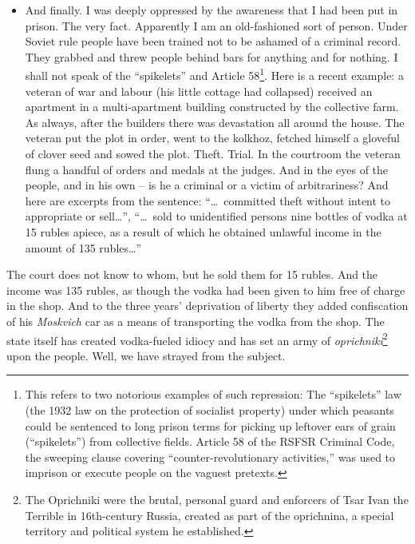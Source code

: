 \documentclass[openright]{bookest}
\begin{document}
\begin{itemize}
\item And finally. I was deeply oppressed by the awareness that I had been put in prison. The very fact. Apparently I am an old-fashioned sort of person. Under Soviet rule people have been trained not to be ashamed of a criminal record. They grabbed and threw people behind bars for anything and for nothing. I shall not speak of the ``spikelets'' and Article 58\footnote{This refers to two notorious examples of such repression: The ``spikelets'' law (the 1932 law on the protection of socialist property) under which peasants could be sentenced to long prison terms for picking up leftover ears of grain (``spikelets'') from collective fields. Article 58 of the RSFSR Criminal Code, the sweeping clause covering ``counter-revolutionary activities,'' was used to imprison or execute people on the vaguest pretexts.}. Here is a recent example: a veteran of war and labour (his little cottage had collapsed) received an apartment in a multi-apartment building constructed by the collective farm. As always, after the builders there was devastation all around the house. The veteran put the plot in order, went to the kolkhoz, fetched himself a gloveful of clover seed and sowed the plot. Theft. Trial. In the courtroom the veteran flung a handful of orders and medals at the judges. And in the eyes of the people, and in his own -- is he a criminal or a victim of arbitrariness? And here are excerpts from the sentence: ``\ldots~committed theft without intent to appropriate or sell\ldots'', ``\ldots~sold to unidentified persons nine bottles of vodka at \num{15} rubles apiece, as a result of which he obtained unlawful income in the amount of \num{135} rubles\ldots''
\end{itemize}

The court does not know to whom, but he sold them for \num{15} rubles. And the income was \num{135} rubles, as though the vodka had been given to him free of charge in the shop. And to the three years' deprivation of liberty they added confiscation of his \textit{Moskvich} car as a means of transporting the vodka from the shop. The state itself has created vodka-fueled idiocy and has set an army of \textit{oprichniki}\footnote{The Oprichniki were the brutal, personal guard and enforcers of Tsar Ivan the Terrible in 16th-century Russia, created as part of the oprichnina, a special territory and political system he established.} upon the people. Well, we have strayed from the subject.
\end{document}
